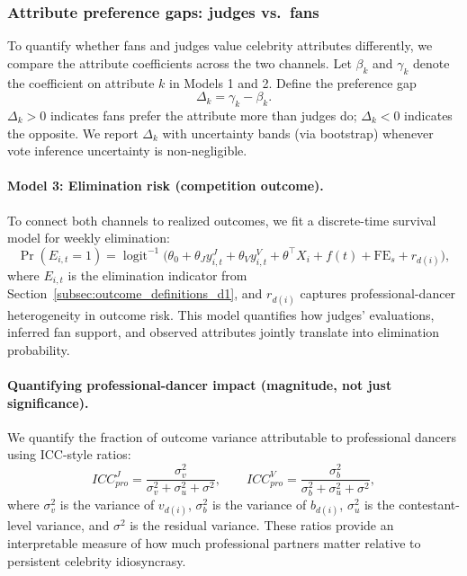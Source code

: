 \subsubsection{Attribute preference gaps: judges vs.\ fans}
\label{subsubsec:attribute_gaps}

To quantify whether fans and judges value celebrity attributes differently, we compare the attribute coefficients across the two channels.
Let $\beta_k$ and $\gamma_k$ denote the coefficient on attribute $k$ in Models 1 and 2. Define the preference gap
\begin{equation}
\Delta_k=\gamma_k-\beta_k.
\end{equation}
$\Delta_k>0$ indicates fans prefer the attribute more than judges do; $\Delta_k<0$ indicates the opposite.
We report $\Delta_k$ with uncertainty bands (via bootstrap) whenever vote inference uncertainty is non-negligible.

\paragraph{Model 3: Elimination risk (competition outcome).}
To connect both channels to realized outcomes, we fit a discrete-time survival model for weekly elimination:
\[
\Pr(E_{i,t}=1)
=
\operatorname{logit}^{-1}\!\Big(
\theta_0
+\theta_J y^J_{i,t}
+\theta_V y^V_{i,t}
+\theta^\top X_i
+f(t)
+\mathrm{FE}_s
+r_{d(i)}
\Big),
\]
where $E_{i,t}$ is the elimination indicator from Section~\ref{subsec:outcome_definitions_d1}, and $r_{d(i)}$ captures professional-dancer heterogeneity in outcome risk.
This model quantifies how judges' evaluations, inferred fan support, and observed attributes jointly translate into elimination probability.


\paragraph{Quantifying professional-dancer impact (magnitude, not just significance).}
We quantify the fraction of outcome variance attributable to professional dancers using ICC-style ratios:
\begin{equation}
ICC^{J}_{pro}=\frac{\sigma_v^{2}}{\sigma_v^{2}+\sigma_u^{2}+\sigma^{2}},\qquad
ICC^{V}_{pro}=\frac{\sigma_b^{2}}{\sigma_b^{2}+\sigma_u^{2}+\sigma^{2}},
\end{equation}
where $\sigma_v^2$ is the variance of $v_{d(i)}$, $\sigma_b^2$ is the variance of $b_{d(i)}$,
$\sigma_u^2$ is the contestant-level variance, and $\sigma^2$ is the residual variance.
These ratios provide an interpretable measure of how much professional partners matter relative to persistent celebrity idiosyncrasy.


